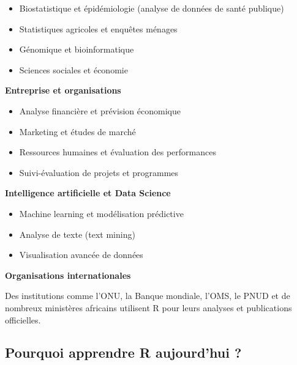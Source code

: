 \documentclass[
  french,
  11pt,
  a4paper,
]{article}
\providecommand{\tightlist}{%
  \setlength{\itemsep}{0pt}\setlength{\parskip}{0pt}}
\begin{document}
\begin{itemize}
\tightlist
\item
  Biostatistique et épidémiologie (analyse de données de santé publique)
\item
  Statistiques agricoles et enquêtes ménages
\item
  Génomique et bioinformatique
\item
  Sciences sociales et économie
\end{itemize}

\textbf{Entreprise et organisations}

\begin{itemize}
\tightlist
\item
  Analyse financière et prévision économique
\item
  Marketing et études de marché
\item
  Ressources humaines et évaluation des performances
\item
  Suivi-évaluation de projets et programmes
\end{itemize}

\textbf{Intelligence artificielle et Data Science}

\begin{itemize}
\tightlist
\item
  Machine learning et modélisation prédictive
\item
  Analyse de texte (text mining)
\item
  Visualisation avancée de données
\end{itemize}

\textbf{Organisations internationales}

Des institutions comme l'ONU, la Banque mondiale, l'OMS, le PNUD et de
nombreux ministères africains utilisent R pour leurs analyses et
publications officielles.

\subsection{Pourquoi apprendre R aujourd'hui
?}\label{pourquoi-apprendre-r-aujourdhui}
\end{document}
